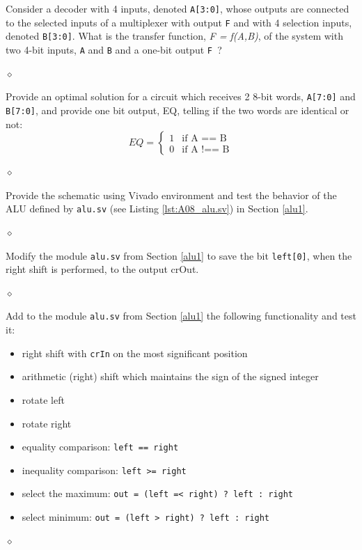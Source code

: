 \begin{problem}\label{eq}
Consider a decoder with 4 inputs, denoted {\tt A[3:0]}, whose outputs are connected to the selected inputs of a multiplexer with output {\tt F} and with 4 selection inputs, denoted {\tt B[3:0]}. What is the transfer function, {\em F = f(A,B)}, of the system with two 4-bit inputs, {\tt A} and {\tt B} and a one-bit output {\tt F }?

$\diamond$
\end{problem}

\begin{problem}
Provide an optimal solution for a circuit which receives 2 8-bit words, {\tt A[7:0]} and {\tt B[7:0]},  and provide one bit output, EQ, telling if the two words are identical or not:
\begin{equation}
  EQ =
    \begin{cases}
      1 & \text{if  A == B}\\
      0 & \text{if  A !== B}
    \end{cases}
\end{equation}

$\diamond$
\end{problem}


\begin{problem}
Provide the schematic using Vivado environment and test the behavior of the ALU defined by {\tt alu.sv} (see Listing \ref{lst:A08_alu.sv}) in Section \ref{alu1}.

$\diamond$
\end{problem}


\begin{problem}
Modify the module {\tt alu.sv} from Section \ref{alu1} to save the bit {\tt left[0]}, when the right shift is performed, to the output crOut.

$\diamond$
\end{problem}


\begin{problem}\label{upgradeALU}
Add to the module {\tt alu.sv} from Section \ref{alu1} the following functionality and test it:
\begin{itemize}
    \item right shift with {\tt crIn} on the most significant position
    \item arithmetic (right) shift which maintains the sign of the signed integer
    \item rotate left
    \item rotate right
    \item equality comparison: {\tt left == right}
    \item inequality comparison: {\tt left >= right}
    \item select the maximum: {\tt out = (left =< right) ? left : right}
    \item select minimum: {\tt out = (left > right) ? left : right}
\end{itemize}

$\diamond$
\end{problem}



